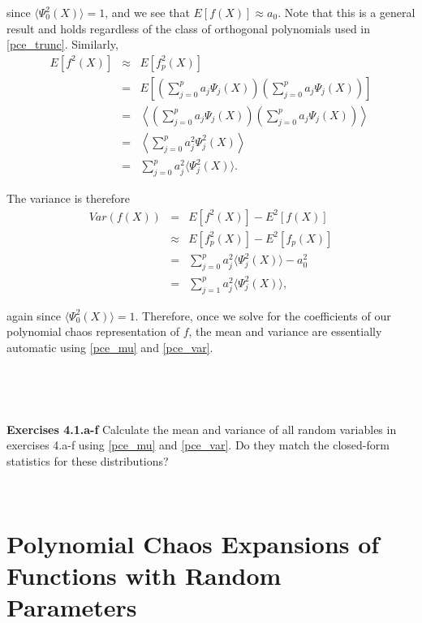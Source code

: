 \documentclass[11pt]{article}
\numberwithin{equation}{section}
\begin{document}
since $\langle \Psi_0^2(X) \rangle = 1$, and we see that $E[ f(X) ] \approx a_0$. Note that this is a general result and holds regardless of the class of orthogonal polynomials used in \eqref{pce_trunc}. Similarly,
\begin{eqnarray*}
E [ f^2(X) ] & \approx & E [ f_p^2(X) ] \\
& = & E \left[ \left( \sum_{j = 0}^p a_j \Psi_j(X) \right) \left( \sum_{j = 0}^p a_j \Psi_j(X) \right) \right] \\
& = & \left\langle \left( \sum_{j = 0}^p a_j \Psi_j(X) \right) \left( \sum_{j = 0}^p a_j \Psi_j(X) \right) \right\rangle \\
& = & \left\langle \sum_{j = 0}^p a_j^2 \Psi_j^2(X) \right\rangle \\
& = & \sum_{j = 0}^p a_j^2  \langle \Psi_j^2(X) \rangle.
\end{eqnarray*}

The variance is therefore
\begin{eqnarray}
Var(f(X)) & = & E \left[ f^2(X) \right] - E^2 \left[ f(X) \right] \nonumber \\
& \approx & E \left[ f_p^2(X) \right] - E^2 \left[ f_p(X) \right] \nonumber \\
& = & \sum_{j = 0}^p a_j^2  \langle \Psi_j^2(X) \rangle - a_0^2  \nonumber \\
& = & \sum_{j = 1}^p a_j^2  \langle \Psi_j^2(X) \rangle, \label{pce_var}
\end{eqnarray}

again since $\langle \Psi_0^2(X) \rangle = 1$. Therefore, once we solve for the coefficients of our polynomial chaos representation of $f$, the mean and variance are essentially automatic using \eqref{pce_mu} and \eqref{pce_var}.





\

\

\textbf{Exercises 4.1.a-f} Calculate the mean and variance of all random variables in exercises 4.a-f using \eqref{pce_mu} and \eqref{pce_var}. Do they match the closed-form statistics for these distributions?

\











\section{Polynomial Chaos Expansions of Functions with Random Parameters}
\end{document}
